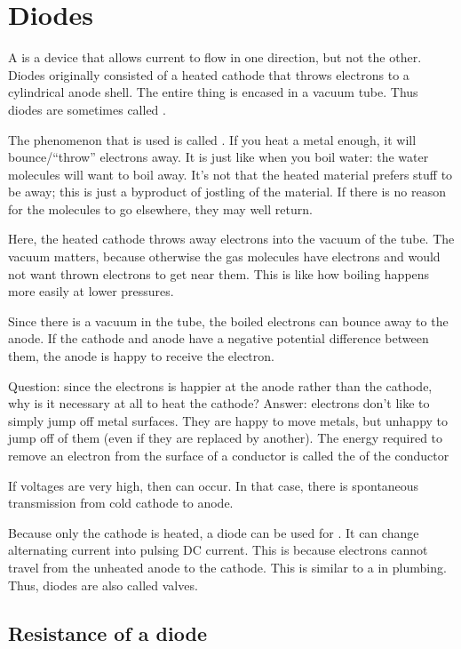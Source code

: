\documentclass[11pt, oneside]{amsart}
\begin{document}
\section{Diodes}

A  is a device that allows current to flow in one
direction, but not the other. Diodes originally consisted of a heated
cathode that throws electrons to a cylindrical anode shell. The entire
thing is encased in a vacuum tube. Thus diodes are sometimes called
.

The phenomenon that is used is called . If
you heat a metal enough, it will bounce/``throw'' electrons away. It is
just like when you boil water: the water molecules will want to boil
away. It's not that the heated material prefers stuff to be away; this
is just a byproduct of jostling of the material. If there is no reason
for the molecules to go elsewhere, they may well return.

Here, the heated cathode throws away electrons into the vacuum of the
tube. The vacuum matters, because otherwise the gas molecules have
electrons and would not want thrown electrons to get near them. This is
like how boiling happens more easily at lower pressures.

Since there is a vacuum in the tube, the boiled electrons can bounce
away to the anode. If the cathode and anode have a negative potential
difference between them, the anode is happy to receive the electron.

Question: since the electrons is happier at the anode rather than the
cathode, why is it necessary at all to heat the cathode? Answer:
electrons don't like to simply jump off metal surfaces. They are happy
to move  metals, but unhappy to jump off of them (even
if they are replaced by another). The energy required to remove an
electron from the surface of a conductor is called the  of the conductor

If voltages are very high, then  can
occur. In that case, there is spontaneous transmission from cold cathode
to anode.

Because only the cathode is heated, a diode can be used for
. It can change alternating current into pulsing
DC current. This is because electrons cannot travel from the unheated
anode to the cathode. This is similar to a  in plumbing.
Thus, diodes are also called valves.

\subsection{Resistance of a diode}
\end{document}
